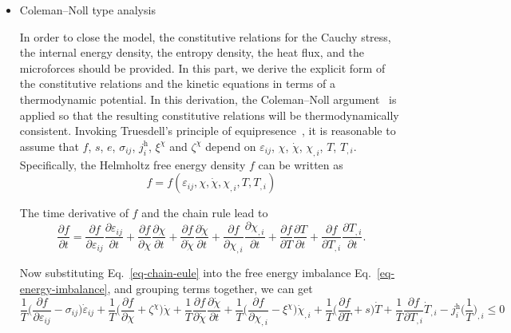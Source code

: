\documentclass[reprint,3p,sort&compress,times,onecolumn]{elsarticle}
\begin{document}
\begin{itemize}
\item Coleman--Noll type analysis

In order to close the model, the constitutive relations for the Cauchy stress, the internal energy density, the entropy density, the heat flux, and the microforces should be provided. In this part, we derive the explicit form of the constitutive relations and the kinetic equations in terms of a thermodynamic potential. In this derivation, the Coleman--Noll argument~\cite{coleman1974thermodynamics} is applied so that the resulting constitutive relations will be thermodynamically consistent.
Invoking Truesdell's principle of equipresence~\cite{truesdell2004non}, it is reasonable to assume that $f$, $s$, $e$, $\sigma_{ij}$,  $j_i^{\text{h}}$, $\xi^{\chi}$ and $\zeta^{\chi}$ depend on $\varepsilon_{ij}$, $\chi$, $\dot{\chi}$, $\chi_{,i}$, $T$, $T_{,i}$. Specifically, the Helmholtz free energy density $f$ can be written as
\begin{equation}
f=f(\varepsilon_{ij}, \chi, \dot{\chi}, \chi_{,i}, T, T_{,i}) \label{eq-f-depend}
\end{equation}

The time derivative of $f$ and the chain rule lead to
\begin{equation}
\frac{\partial f}{\partial t}= \frac{\partial f}{\partial \varepsilon_{ij}}\frac{\partial \varepsilon_{ij}}{\partial t}+ \frac{\partial f}{\partial \chi}\frac{\partial \chi}{\partial t}+  \frac{\partial f}{\partial \dot{\chi}}\frac{\partial \dot{\chi}}{\partial t} + \frac{\partial f}{\partial \chi_{,i}}\frac{\partial \chi_{,i}}{\partial t}+ \frac{\partial f}{\partial T}\frac{\partial T}{\partial t}+ \frac{\partial f}{\partial T_{,i}}\frac{\partial T_{,i}}{\partial t} . \label{eq-chain-eule}
\end{equation}

Now substituting Eq.~\ref{eq-chain-eule} into the free energy imbalance Eq.~\ref{eq-energy-imbalance}, and grouping terms together, we can get
\begin{equation}
\frac{1}{T}\Big(\frac{\partial f}{\partial \varepsilon_{ij}}-\sigma_{ij}  \Big)\dot{\varepsilon}_{ij}+ \frac{1}{T}\Big(\frac{\partial f}{\partial \chi}+  \zeta^{\chi}\Big) \dot{\chi}+ \frac{1}{T} \frac{\partial f}{\partial \dot{\chi}}\frac{\partial \dot{\chi}}{\partial t} + \frac{1}{T}\Big(\frac{\partial f}{\partial \chi_{,i}}-\xi^{\chi} \Big)\dot{\chi}_{,i}+ \frac{1}{T}\Big(\frac{\partial f}{\partial T}+s\Big) \dot{T} + \frac{1}{T}\frac{\partial f}{\partial T_{,i}} \dot{T}_{,i}-j_i^{\text{h}} \Big(\frac{1}{T}\Big)_{,i} \leq 0 \label{eq-last-second}
\end{equation}


\end{itemize}
\end{document}
